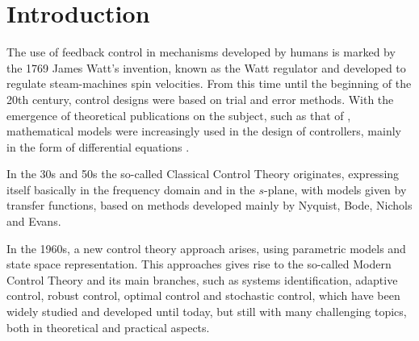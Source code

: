 

\chapter{Introduction}\label{cap1}
\vspace{-1cm}

%




The use of feedback control in mechanisms developed by humans is marked by the 1769 James Watt's invention, known as the Watt regulator and developed to regulate steam-machines spin velocities.
From this time until the beginning of the 20th century, control designs were based on trial and error methods. With the emergence of theoretical publications on the subject, such as that of \citep{tolle1921}, mathematical models were increasingly used in the design of controllers, mainly in the form of differential equations \citep{takahashi1972}.

In the 30s and 50s the so-called Classical Control Theory originates, expressing itself basically in the frequency domain and in the $s$-plane, with models given by transfer functions, based on methods developed mainly by Nyquist, Bode, Nichols and Evans.

In the 1960s, a new control theory approach arises, using parametric models and state space representation. This approaches gives rise to the so-called Modern Control Theory and its main branches, such as systems identification, adaptive control, robust control, optimal control and stochastic control, which have been widely studied and developed until today, but still with many challenging topics, both in theoretical and practical aspects. %

